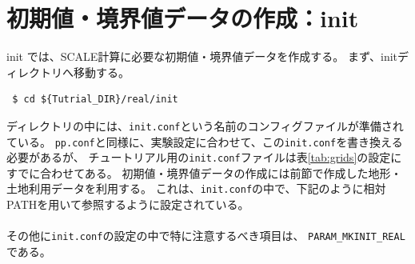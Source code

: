 
\section{初期値・境界値データの作成：init}

init では、SCALE計算に必要な初期値・境界値データを作成する。
まず、initディレクトリへ移動する。
\begin{verbatim}
 $ cd ${Tutrial_DIR}/real/init
\end{verbatim}
ディレクトリの中には、\verb|init.conf|という名前のコンフィグファイルが準備されている。
\verb|pp.conf|と同様に、実験設定に合わせて、この\verb|init.conf|を書き換える必要があるが、
チュートリアル用の\verb|init.conf|ファイルは表\ref{tab:grids}の設定に
すでに合わせてある。
初期値・境界値データの作成には前節で作成した地形・土地利用データを利用する。
これは、\verb|init.conf|の中で、下記のように相対PATHを用いて参照するように設定されている。\\

\\

\noindent その他に\verb|init.conf|の設定の中で特に注意するべき項目は、
\verb|PARAM_MKINIT_REAL|である。\\

